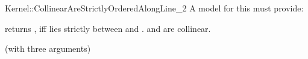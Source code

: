 \begin{ccRefFunctionObjectConcept}{Kernel::CollinearAreStrictlyOrderedAlongLine_2}
A model for this must provide:


         {returns , iff  lies strictly between 
          and . \ccPrecond {} and 
          are collinear.}

\ccRefines
{} (with three arguments)

\ccSeeAlso
{}  \\

\end{ccRefFunctionObjectConcept}
